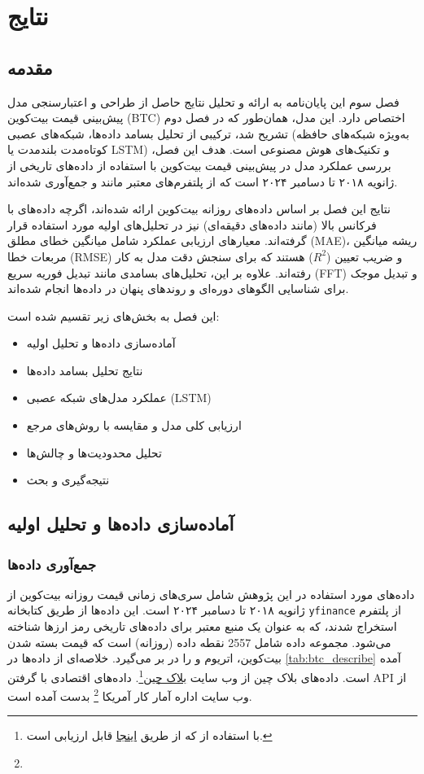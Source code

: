 \chapter{نتایج}
\label{chap:results}

\section{مقدمه}
فصل سوم این پایان‌نامه به ارائه و تحلیل نتایج حاصل از طراحی و اعتبارسنجی مدل پیش‌بینی قیمت بیت‌کوین (BTC) اختصاص دارد. این مدل، همان‌طور که در فصل دوم تشریح شد، ترکیبی از تحلیل بسامد داده‌ها، شبکه‌های عصبی (به‌ویژه شبکه‌های حافظه کوتاه‌مدت بلندمدت یا LSTM) و تکنیک‌های هوش مصنوعی است. هدف این فصل، بررسی عملکرد مدل در پیش‌بینی قیمت بیت‌کوین با استفاده از داده‌های تاریخی از ژانویه ۲۰۱۸ تا دسامبر ۲۰۲۴ است که از پلتفرم‌های معتبر مانند  و  جمع‌آوری شده‌اند. 

نتایج این فصل بر اساس داده‌های روزانه بیت‌کوین ارائه شده‌اند، اگرچه داده‌های با فرکانس بالا (مانند داده‌های دقیقه‌ای) نیز در تحلیل‌های اولیه مورد استفاده قرار گرفته‌اند. معیارهای ارزیابی عملکرد شامل میانگین خطای مطلق (MAE)، ریشه میانگین مربعات خطا (RMSE) و ضریب تعیین (\(R^2\)) هستند که برای سنجش دقت مدل به کار رفته‌اند. علاوه بر این، تحلیل‌های بسامدی مانند تبدیل فوریه سریع (FFT) و تبدیل موجک برای شناسایی الگوهای دوره‌ای و روندهای پنهان در داده‌ها انجام شده‌اند.

این فصل به بخش‌های زیر تقسیم شده است:
\begin{itemize}
	\item آماده‌سازی داده‌ها و تحلیل اولیه
	\item نتایج تحلیل بسامد داده‌ها
	\item عملکرد مدل‌های شبکه عصبی (LSTM)
	\item ارزیابی کلی مدل و مقایسه با روش‌های مرجع
	\item تحلیل محدودیت‌ها و چالش‌ها
	\item نتیجه‌گیری و بحث
\end{itemize}

\section{آماده‌سازی داده‌ها و تحلیل اولیه}
\label{sec:data_preparation}

\subsection{جمع‌آوری داده‌ها}
داده‌های مورد استفاده در این پژوهش شامل سری‌های زمانی قیمت روزانه بیت‌کوین از ژانویه ۲۰۱۸ تا دسامبر ۲۰۲۴ است. این داده‌ها از طریق کتابخانه \texttt{yfinance} از پلتفرم  استخراج شدند، که به عنوان یک منبع معتبر برای داده‌های تاریخی رمز ارزها شناخته می‌شود. مجموعه داده شامل 2557 نقطه داده (روزانه) است که قیمت بسته شدن  بیت‌کوین، اتریوم و  را در بر می‌گیرد. خلاصه‌ای از داده‌ها در \ref{tab:btc_describe} آمده است. داده‌های بلاک چین از وب سایت \href{https://www.blockchain.com/}{بلاک چین}\footnote{با استفاده از  که از طریق \href{https://api.blockchain.info/}{اینجا} قابل ارزیابی است.}. داده‌های اقتصادی با گرفتن API از وب سایت اداره آمار کار آمریکا \footnote{} بدست آمده است.
 
